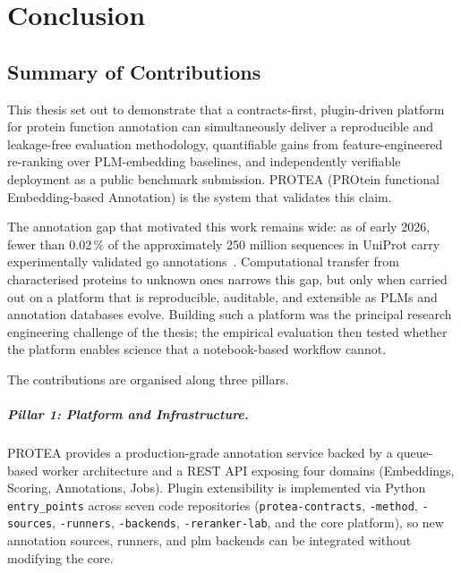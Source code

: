 \chapter{Conclusion}
\label{chap:conclusion}

\section{Summary of Contributions}
\label{sec:conclusion-summary}

This thesis set out to demonstrate that a contracts-first, plugin-driven
platform for protein function annotation can simultaneously deliver a
reproducible and leakage-free evaluation methodology, quantifiable gains
from feature-engineered re-ranking over PLM-embedding baselines, and
independently verifiable deployment as a public benchmark submission.
PROTEA (PROtein functional Embedding-based Annotation) is the system that
validates this claim.

The annotation gap that motivated this work remains wide: as of early 2026,
fewer than 0.02\,\% of the approximately 250 million sequences in UniProt
carry experimentally validated \gls{go} annotations~\cite{uniprot2023}.
Computational transfer from characterised proteins to unknown ones narrows
this gap, but only when carried out on a platform that is reproducible,
auditable, and extensible as PLMs and annotation databases evolve. Building
such a platform was the principal research engineering challenge of the
thesis; the empirical evaluation then tested whether the platform enables
science that a notebook-based workflow cannot.

The contributions are organised along three pillars.

\paragraph{Pillar 1: Platform and Infrastructure.}

PROTEA provides a production-grade annotation service backed by a
queue-based worker architecture and a REST API exposing four domains
(Embeddings, Scoring, Annotations, Jobs). Plugin extensibility is
implemented via Python \texttt{entry\_points} across seven code repositories
(\texttt{protea-contracts}, \texttt{-method}, \texttt{-sources},
\texttt{-runners}, \texttt{-backends}, \texttt{-reranker-lab}, and the core
platform), so new annotation sources, runners, and \gls{plm} backends can
be integrated without modifying the core.

